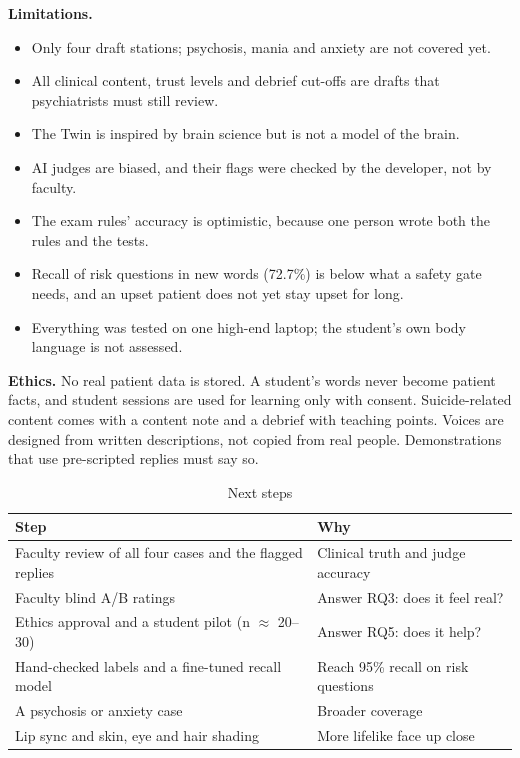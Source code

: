 \documentclass[journal]{IEEEtran}
\begin{document}
\textbf{Limitations.}
\begin{itemize}
\item Only four draft stations; psychosis, mania and anxiety are not covered yet.
\item All clinical content, trust levels and debrief cut-offs are drafts that psychiatrists must still review.
\item The Twin is inspired by brain science but is not a model of the brain.
\item AI judges are biased, and their flags were checked by the developer, not by faculty.
\item The exam rules' accuracy is optimistic, because one person wrote both the rules and the tests.
\item Recall of risk questions in new words (72.7\%) is below what a safety gate needs, and an upset patient does not yet stay upset for long.
\item Everything was tested on one high-end laptop; the student's own body language is not assessed.
\end{itemize}

\textbf{Ethics.} No real patient data is stored. A student's words never become patient facts, and student sessions are used for learning only with
consent. Suicide-related content comes with a content note and a debrief with teaching points. Voices are designed from written descriptions, not copied
from real people. Demonstrations that use pre-scripted replies must say so.

\begin{table}[t]
\caption{Next steps}
\label{tab:next}
\centering
\scriptsize
\begin{tabularx}{\columnwidth}{@{}YY@{}}
\toprule
Step & Why\\
\midrule
Faculty review of all four cases and the flagged replies & Clinical truth and judge accuracy\\
Faculty blind A/B ratings & Answer RQ3: does it feel real?\\
Ethics approval and a student pilot (n $\approx$ 20--30) & Answer RQ5: does it help?\\
Hand-checked labels and a fine-tuned recall model & Reach 95\% recall on risk questions\\
A psychosis or anxiety case & Broader coverage\\
Lip sync and skin, eye and hair shading & More lifelike face up close\\
\bottomrule
\end{tabularx}
\end{table}
\end{document}
